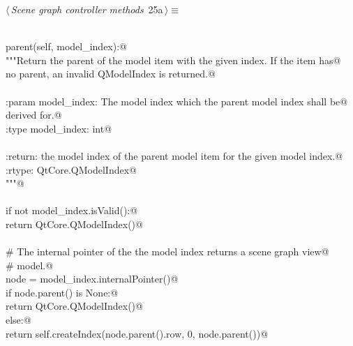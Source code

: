 \documentclass[
    a4paper,      %
    10pt,         %
    openright,    %
    notitlepage,  %
    parskip=half, %
]{scrreprt}       %
\theoremstyle{definition}                    %
\begin{document}
\begin{flushleft} \small
\begin{minipage}{\linewidth}\label{scrap20}\raggedright\small
{} $\langle\,${\itshape Scene graph controller methods}\nobreak\ {\footnotesize {25a}}$\,\rangle\equiv$
\vspace{-1ex}
\begin{list}{}{} \item
\mbox{}\lstinline@@\\
\mbox{}\lstinline@def parent(self, model_index):@\\
\mbox{}\lstinline@    """Return the parent of the model item with the given index. If the item has@\\
\mbox{}\lstinline@    no parent, an invalid QModelIndex is returned.@\\
\mbox{}\lstinline@@\\
\mbox{}\lstinline@    :param model_index: The model index which the parent model index shall be@\\
\mbox{}\lstinline@                        derived for.@\\
\mbox{}\lstinline@    :type model_index: int@\\
\mbox{}\lstinline@@\\
\mbox{}\lstinline@    :return: the model index of the parent model item for the given model index.@\\
\mbox{}\lstinline@    :rtype: QtCore.QModelIndex@\\
\mbox{}\lstinline@    """@\\
\mbox{}\lstinline@@\\
\mbox{}\lstinline@    if not model_index.isValid():@\\
\mbox{}\lstinline@        return QtCore.QModelIndex()@\\
\mbox{}\lstinline@@\\
\mbox{}\lstinline@    # The internal pointer of the the model index returns a scene graph view@\\
\mbox{}\lstinline@    # model.@\\
\mbox{}\lstinline@    node = model_index.internalPointer()@\\
\mbox{}\lstinline@    if node.parent() is None:@\\
\mbox{}\lstinline@        return QtCore.QModelIndex()@\\
\mbox{}\lstinline@    else:@\\
\mbox{}\lstinline@        return self.createIndex(node.parent().row, 0, node.parent())@\\

\end{list}
\end{minipage}
\end{flushleft}
\end{document}
